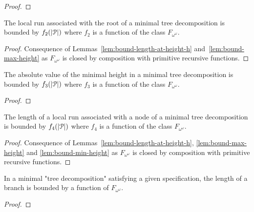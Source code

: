 \begin{proof}
\end{proof}

\begin{corollary}
	The local run associated with the root of a minimal tree decomposition is bounded by $f_2(|\mathcal{P}|)$ where $f_2$ is a function of the class $F_{\omega^\omega}$.
\end{corollary}

\begin{proof}
	Consequence of Lemmas~\ref{lem:bound-length-at-height-h} and~\ref{lem:bound-max-height} as $F_{\omega^\omega}$ is closed by composition with primitive recursive functions.
\end{proof}

\begin{lemma}
	\label{lem:bound-min-height}
	The absolute value of the minimal height in a minimal tree decomposition is bounded by $f_3(|\mathcal{P}|)$ where $f_3$ is a function of the class $F_{\omega^\omega}$.
\end{lemma}

\begin{proof}
\end{proof}

\begin{corollary}
	\label{lem:bound-node-size}
	The length of a local run associated with a node of a minimal tree decomposition is bounded by $f_4(|\mathcal{P}|)$ where $f_4$ is a function of the class $F_{\omega^\omega}$.
\end{corollary}

\begin{proof}
	Consequence of Lemmas~\ref{lem:bound-length-at-height-h}, \ref{lem:bound-max-height} and \ref{lem:bound-min-height} as $F_{\omega^\omega}$ is closed by composition with primitive recursive functions.
\end{proof}

\begin{proposition}
	In a minimal "tree decomposition" satisfying a given specification, the length of a branch is bounded by a function of $F_{\omega^\omega}$.
\end{proposition}

\begin{proof}
\end{proof}

%

